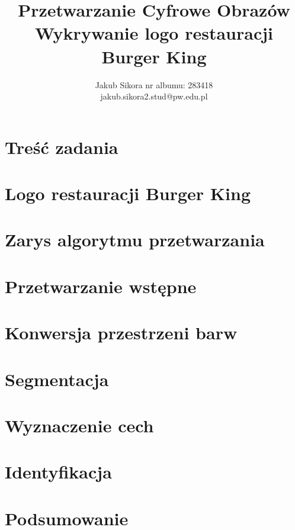 \documentclass{article}
\title{Przetwarzanie Cyfrowe Obrazów \\ Wykrywanie logo restauracji Burger King}
\author{
Jakub Sikora
\affiliations
nr albumu: 283418\\
\emails
jakub.sikora2.stud@pw.edu.pl
}
\newcommand{\bk}{
    Burger King
}
\begin{document}
\maketitle

\section{Treść zadania}
\label{sec:cel-projektu}


\section{Logo restauracji \bk}
\label{sec:logo-bk}


\section{Zarys algorytmu przetwarzania}
\label{sec:algorytm}


\section{Przetwarzanie wstępne}
\label{sec:preprocessing}


\section{Konwersja przestrzeni barw}
\label{sec:przestrzenie}


\section{Segmentacja}
\label{sec:segmentacja}


\section{Wyznaczenie cech}
\label{sec:wyznaczanie-cech}


\section{Identyfikacja}
\label{sec:identyfikacja-cech}


\section{Podsumowanie}
\label{sec:podsumowanie}




\end{document}
